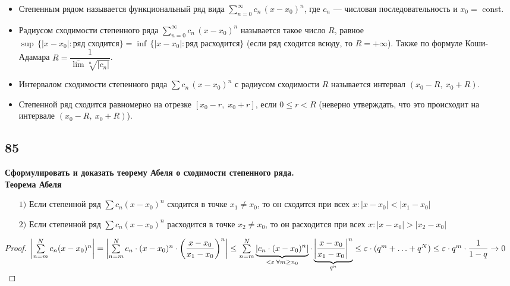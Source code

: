 \documentclass[a4paper, fleqn]{article}
\begin{document}
    \begin{itemize}
        \item Степенным рядом называется функциональный ряд вида $\sum \limits_{n = 0}^{\infty} c_n \, (x - x_0)^n$, 
    где $c_n$ --- числовая последовательность и $x_0 =$ const.

        \item Радиусом сходимости степенного ряда $\sum \limits_{n = 0}^{\infty} c_n \, (x - x_0)^n$ называется такое число $R$,
    равное \\ ${\sup \, \bigl\{|x - x_0| : \text{ряд сходится}\bigr\}} = {\inf \, \bigl\{|x - x_0| : \text{ряд расходится}\bigr\}}$
    (если ряд сходится всюду, то ${R = +\infty}$). Также по формуле Коши-Адамара $R = \dfrac1{\overline{\lim} \sqrt[n]{|c_n|}}$.

        \item Интервалом сходимости степенного ряда $\sum c_n \, (x - x_0)^n$ с радиусом сходимости $R$ называется интервал $(x_0 - R, \: x_0 + R)$.

        \item Степенной ряд сходится равномерно на отрезке $[x_0 - r, \; x_0 + r]$, если $0 \leqslant r < R$ 
    (неверно утверждать, что это происходит на интервале $(x_0 - R, \: x_0 + R)$). 
    \end{itemize}
        
        
    \subsection*{85}
    \textbf{ Сформулировать и доказать теорему Абеля о сходимости степенного ряда.} \\[5 pt]
    \textbf{ Теорема Абеля} \\[-15 pt] 
    \begin{enumerate}
    \item[$1)$] Если степенной ряд $\sum c_n (x - x_0)^n$ сходится в точке $x_1 \ne x_0$, 
    то он сходится при всех $x : |x - x_0| < |x_1 - x_0|$
    \item[$2)$] Если степенной ряд $\sum c_n (x - x_0)^n$ расходится в точке $x_2 \ne x_0$, 
    то он расходится при всех $x : |x - x_0| > |x_2 - x_0|$\\[-30 pt]
    \end{enumerate}
    \begin{proof}
    $\left| \sum\limits_{n = m}^N c_n (x - x_0)^n \right| = 
    \left| \sum\limits_{n = m}^N c_n \cdot (x - x_0)^n \cdot \left( \dfrac{x - x_0}{x_1 - x_0} \right)^n \right| \le  \\[3 pt]
    \sum\limits_{n = m}^N \underbrace{\left| c_n \cdot (x - x_0)^n \right|}_{< \varepsilon \; \forall m \ge n_0} \cdot 
    \underbrace{\left| \dfrac{x - x_0}{x_1 - x_0} \right|^n}_{q^n}  \le
    \varepsilon \cdot (q^m + \ldots + q^N) \le \varepsilon \cdot q^m \cdot \dfrac1{1 - q} \to 0$
    \end{proof}    
    
\end{document}
